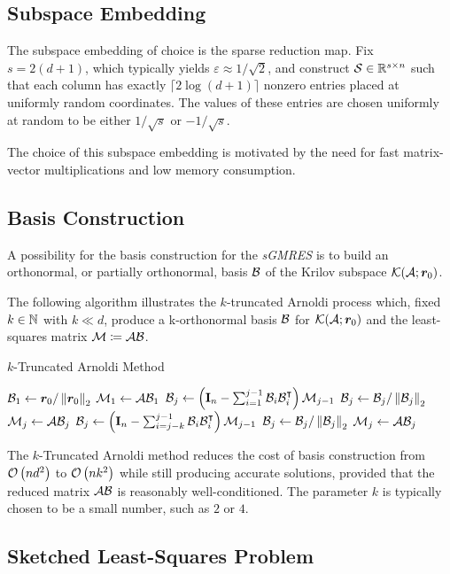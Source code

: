 \subsection{Subspace Embedding}

The subspace embedding of choice is the sparse reduction map. Fix $s = 2 \left( d + 1 \right)$, which typically yields $\varepsilon \approx 1 / \sqrt{2}$, and construct $\mathcal{S} \in \mathbb{R}^{s \times n}$ such that each column has exactly $\lceil 2 \log \left( d + 1 \right) \rceil$ nonzero entries placed at uniformly random coordinates. The values of these entries are chosen uniformly at random to be either $1 / \sqrt{s}$ or $-1 / \sqrt{s}$.

The choice of this subspace embedding is motivated by the need for fast matrix-vector multiplications and low memory consumption.

\subsection{Basis Construction} \label{sseq:basis}

A possibility for the basis construction for the \textit{sGMRES} is to build an orthonormal, or partially orthonormal, basis $\mathcal{B}$ of the Krilov subspace $\mathcal{K}(\mathcal{A}; \bm{r}_0)$.

The following algorithm illustrates the $k$-truncated Arnoldi process which, fixed $k \in \mathbb{N}$ with $k \ll d$, produce a k-orthonormal basis $\mathcal{B}$ for $\mathcal{K}(\mathcal{A}; \bm{r}_0)$ and the least-squares matrix $\mathcal{M} \coloneqq \mathcal{A} \mathcal{B}$.

\begin{algorithm}
\caption{$k$-Truncated Arnoldi Method} \label{alg:arnoldi}
\begin{algorithmic}
\State $\mathcal{B}_1 \gets \bm{r}_0 / \left\lVert \bm{r}_0 \right\rVert_2$
\State $\mathcal{M}_1 \gets \mathcal{A} \mathcal{B}_1$
    \State $\mathcal{B}_j \gets \left( \mathbf{I}_n - \sum_{i=1}^{j-1} \mathcal{B}_i \mathcal{B}_i^{\intercal} \right) \mathcal{M}_{j-1}$
    \State $\mathcal{B}_j \gets \mathcal{B}_j / \left\lVert \mathcal{B}_j \right\rVert_2$
    \State $\mathcal{M}_j \gets \mathcal{A} \mathcal{B}_j$
\EndFor
{}
    \State $\mathcal{B}_j \gets \left( \mathbf{I}_n - \sum_{i=j-k}^{j-1} \mathcal{B}_i \mathcal{B}_i^{\intercal} \right) \mathcal{M}_{j-1}$
    \State $\mathcal{B}_j \gets \mathcal{B}_j / \left\lVert \mathcal{B}_j \right\rVert_2$
    \State $\mathcal{M}_j \gets \mathcal{A} \mathcal{B}_j$
\EndFor
\end{algorithmic}
\end{algorithm}

The $k$-Truncated Arnoldi method reduces the cost of basis construction from $\mathcal{O} \left( n d^2 \right)$ to $\mathcal{O} \left( n k^2 \right)$ while still producing accurate solutions, provided that the reduced matrix $\mathcal{A} \mathcal{B}$ is reasonably well-conditioned. The parameter $k$ is typically chosen to be a small number, such as $2$ or $4$.

\subsection{Sketched Least-Squares Problem} \label{sseq:least_squares}